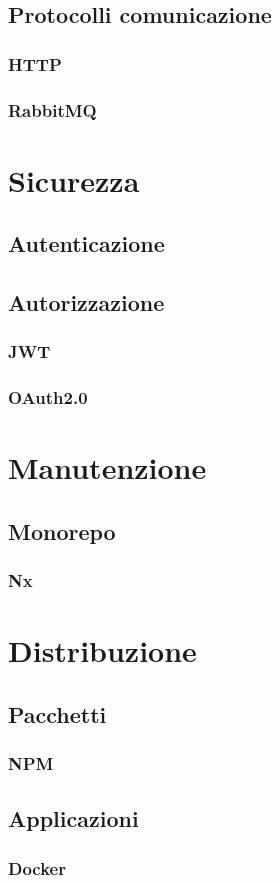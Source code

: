\subsection{Protocolli comunicazione}
\subsubsection{HTTP}
\subsubsection{RabbitMQ}

\section{Sicurezza}
\subsection{Autenticazione}
\subsection{Autorizzazione}
\subsubsection{JWT}
\subsubsection{OAuth2.0}



\section{Manutenzione}
\subsection{Monorepo}
\subsubsection{Nx}

\section{Distribuzione}
\subsection{Pacchetti}
\subsubsection{NPM}
\subsection{Applicazioni}
\subsubsection{Docker}

